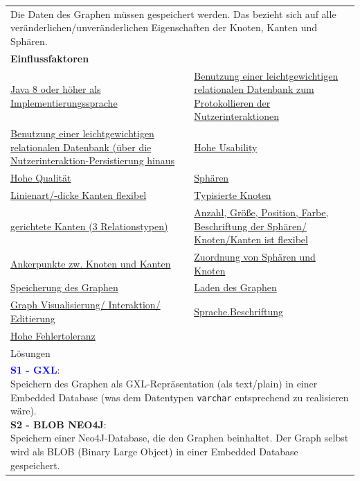 \documentclass[enabledeprecatedfontcommands,fontsize=11pt,paper=a4,twoside]{scrartcl}
\newcounter{one}
\newcommand{\cb}[1]{{\textcolor{blue}{#1}}}
\begin{document}
	\begin{tabular} {|p{8cm} p{8cm}|}
		\hline
		\rowcolor{prob}\multicolumn{2}{|l|}{\parbox{16cm}{\textbf{01: Datensicherung/Persistenz des Graphen}}} \\  \hline\hline 
		\multicolumn{2}{|l|}{\parbox{16cm}{Die Daten des Graphen müssen gespeichert werden. Das bezieht sich auf alle veränderlichen/unveränderlichen Eigenschaften der Knoten, Kanten und Sphären.}}\rule{0pt}{4ex}\\ [1ex] \hline
		\multicolumn{2}{|l|}{\textbf{Einflussfaktoren}}\\
		\hyperlink{b}{Java 8 oder höher als Implementierungssprache}  & \hyperlink {d}{Benutzung einer leichtgewichtigen relationalen Datenbank zum Protokollieren der Nutzerinteraktionen}\\ 
		\hyperlink {e}{Benutzung einer leichtgewichtigen relationalen Datenbank (über die Nutzerinteraktion-Persistierung hinaus} & \hyperlink {g}{Hohe Usability}\\
		\hyperlink {h}{Hohe Qualität} &
		\hyperlink {n}{Sphären} \\
		\hyperlink {o}{Linienart/-dicke Kanten flexibel}&
		\hyperlink {p}{Typisierte Knoten} \\
		\hyperlink {q}{gerichtete Kanten (3 Relationstypen)} &
		\hyperlink {r}{Anzahl, Größe, Position, Farbe, Beschriftung der Sphären/ Knoten/Kanten ist flexibel} \\
		\hyperlink {s}{Ankerpunkte zw. Knoten und Kanten} &
		\hyperlink {t}{Zuordnung von Sphären und Knoten} \\
		\hyperlink {v}{Speicherung des Graphen} &
		\hyperlink {w}{Laden des Graphen} \\
		\hyperlink {aa}{Graph Visualisierung/ Interaktion/ Editierung}&
		\hyperlink {hh}{Sprache.Beschriftung} \\
		\hyperlink {tt}{Hohe Fehlertoleranz} &
		\\ \hline
		\multicolumn{2}{|l|}{Lösungen} \\
		\multicolumn{2}{|l|}{\parbox{16cm}{
				\textbf{\cb{\hypertarget{yy}{S1 - GXL}}}: \\
				Speichern des Graphen als GXL-Repräsentation (als text/plain) in einer Embedded Database (was dem Datentypen \texttt{varchar} entsprechend zu realisieren wäre). \\
				\textbf{S2 - BLOB NEO4J}: \\
				Speichern einer Neo4J-Database, die den Graphen beinhaltet. Der Graph selbst wird als BLOB (Binary Large Object) in einer Embedded Database gespeichert. \\
}}
\end{tabular}
\end{document}
